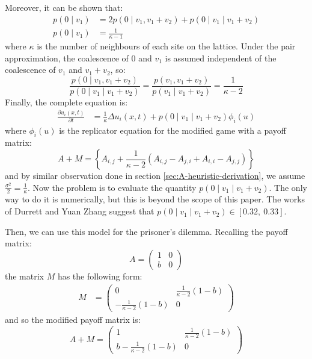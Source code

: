 Moreover, it can be shown that:
\begin{align*}
p\left(0\mid v_{1}\right) & =2p\left(0\mid v_{1},v_{1}+v_{2}\right)+p\left(0\mid v_{1}\mid v_{1}+v_{2}\right)\\
p\left(0\mid v_{1}\right) & =\frac{1}{\kappa-1}
\end{align*}
where $\kappa$ is the number of neighbours of each site on the lattice.
Under the pair approximation, the coalescence of $0$ and $v_{1}$
is assumed independent of the coalescence of $v_{1}$ and $v_{1}+v_{2}$\cite{durrett_spatial_2014},
so: 
\[
\frac{p\left(0\mid v_{1},v_{1}+v_{2}\right)}{p\left(0\mid v_{1}\mid v_{1}+v_{2}\right)}=\frac{p\left(v_{1},v_{1}+v_{2}\right)}{p\left(v_{1}\mid v_{1}+v_{2}\right)}=\frac{1}{\kappa-2}
\]
Finally, the complete equation is:
\begin{align}
\frac{\partial u_{i}\left(x,t\right)}{\partial t} & =\frac{1}{\kappa}\Delta u_{i}\left(x,t\right)+p\left(0\mid v_{1}\mid v_{1}+v_{2}\right)\phi_{i}\left(u\right)\label{eq:RDE_durr}
\end{align}
where $\phi_{i}\left(u\right)$ is the replicator equation for the
modified game with a payoff matrix: 
\begin{equation}
A+M=\left\{ A_{i,j}+\frac{1}{\kappa-2}\left(A_{i,j}-A_{j,i}+A_{i,i}-A_{j,j}\right)\right\} \label{eq:A+M}
\end{equation}
 and by similar observation done in section \ref{sec:A-heuristic-derivation},
we assume $\frac{\sigma^{2}}{2}=\frac{1}{\kappa}$. Now the problem
is to evaluate the quantity $p\left(0\mid v_{1}\mid v_{1}+v_{2}\right)$.
The only way to do it is numerically, but this is beyond the scope
of this paper. The works of Durrett and Yuan Zhang suggest that $p\left(0\mid v_{1}\mid v_{1}+v_{2}\right)\in\left[0.32,\ 0.33\right]$.

Then, we can use this model for the prisoner's dilemma. Recalling
the payoff matrix: 
\[
A=\left(\begin{array}{cc}
1 & 0\\
b & 0
\end{array}\right)
\]
 the matrix $M$ has the following form:
\begin{align*}
M & =\left(\begin{array}{cc}
0 & \frac{1}{\kappa-2}\left(1-b\right)\\
-\frac{1}{\kappa-2}\left(1-b\right) & 0
\end{array}\right)
\end{align*}
 and so the modified payoff matrix is:
\[
A+M=\left(\begin{array}{cc}
1 & \frac{1}{\kappa-2}\left(1-b\right)\\
b-\frac{1}{\kappa-2}\left(1-b\right) & 0
\end{array}\right)
\]


